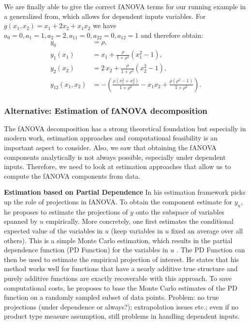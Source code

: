 We are finally able to give the correct fANOVA terms for our running example in a generalized from, which allows for dependent inputs variables. For $g(x_1,x_2) = x_1 + 2x_2 + x_1 x_2$  we have $a_0 = 0, a_1 = 1, a_2 = 2, a_{11} = 0, a_{22} = 0, a_{12} = 1$ and therefore obtain:
\begin{align*}
y_0 &= \rho, \\[3pt]
y_1(x_1) &= x_1 + \frac{\rho}{1+\rho^2}(x_1^2 - 1), \\[3pt]
y_2(x_2) &= 2\,x_2 + \frac{\rho}{1+\rho^2}(x_2^2 - 1), \\[3pt]
y_{12}(x_1,x_2) 
&= -\left(\frac{\rho(x_1^2+x_2^2)}{1+\rho^2} - x_1 x_2 + \frac{\rho(\rho^2-1)}{1+\rho^2}\right).
\end{align*}

\subsubsection{Alternative: Estimation of fANOVA decomposition}
The fANOVA decomposition has a strong theoretical foundation but especially in modern work, estimation approaches and computational feasibility is an important aspect to consider.
Also, we saw that obtaining the fANOVA components analytically is not always possible, especially under dependent inputs. Therefore, we need to look at estimation approaches that allow us to compute the fANOVA components from data.\par

\textbf{Estimation based on Partial Dependence}
In his estimation framework \cite{hooker2004} picks up the role of projections in fANOVA. To obtain the component estimate for $y_u$, he proposes to estimate the projections of $y$ onto the subspace of variables spanned by $u$ empirically.
More concretely, one first estimates the conditional expected value of the variables in $u$ (keep variables in $u$ fixed an average over all others). This is a simple Monte Carlo estimation, which results in the partial dependence function (PD Function) for the variables in $u$ \citep{hooker2004}.
The PD Function can then be used to estimate the empirical projection of interest. He states that his method works well for functions that have a nearly additive true structure and purely additive functions are exactly recoverable with this approach. To save computational costs, he proposes to base the Monte Carlo estimates of the PD function on a randomly sampled subset of data points.
Problem: no true projections (under dependence or always?); extrapolation issues etc.; even if no product type measure assumption, still problems in handling dependent inputs.\par

